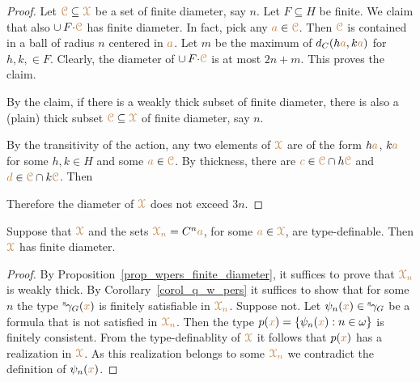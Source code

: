 \begin{proof}
  Let ${\color{brown}\EuScript C}\subseteq{\color{brown}\EuScript X}$ be a set of finite diameter, say $n$.
  Let $F\subseteq H$ be finite.
  We claim that also $\cup\,F{\cdot}{\color{brown}\EuScript C}$ has finite diameter.
  In fact, pick any ${\color{brown} a}\in{\color{brown}\EuScript C}$.
  Then ${\color{brown}\EuScript C}$ is contained in a ball of radius $n$ centered in ${\color{brown} a}$. Let $m$ be the maximum of $d_C(h{\color{brown} a}, k{\color{brown} a})$ for $h,k,\in F$.
  Clearly, the diameter of $\cup\,F{\cdot}{\color{brown}\EuScript C}$ is at most $2n+m$.
  This proves the claim.

  By the claim, if there is a weakly thick subset of finite diameter, there is also a (plain) thick subset ${\color{brown}\EuScript C}\subseteq{\color{brown}\EuScript X}$ of finite diameter, say $n$.
  
  By the transitivity of the action, any two elements of ${\color{brown}\EuScript X}$ are of the form $h{\color{brown} a}$, $k{\color{brown} a}$ for some $h,k\in H$ and some ${\color{brown} a}\in{\color{brown}\EuScript C}$.
  By thickness, there are ${\color{brown} c}\in{\color{brown}\EuScript C}\cap h{\color{brown}\EuScript C}$ and ${\color{brown} d}\in{\color{brown}\EuScript C}\cap k{\color{brown}\EuScript C}$.
  Then 



  Therefore the diameter of ${\color{brown}\EuScript X}$ does not exceed $3n$.
\end{proof}

\begin{theorem}\label{thm_newelski}
  Suppose that ${\color{brown}\EuScript X}$ and the sets ${\color{brown}\EuScript X_n}=C^n{\color{brown} a}$, for some ${\color{brown} a}\in{\color{brown}\EuScript X}$, are type-definable.
  Then ${\color{brown}\EuScript X}$ has finite diameter.
\end{theorem}

\begin{proof}
  By Proposition~\ref{prop_wpers_finite_diameter}, it suffices to prove that ${\color{brown}\EuScript X_n}$ is weakly thick.
  By Corollary~\ref{corol_q_w_pers} it suffices to show that for some $n$ the type ${}^{\rm s}\kern-.2ex\gamma_G({\color{brown} x})$ is finitely satisfiable in ${\color{brown}\EuScript X_n}$.
  Suppose not.
  Let $\psi_n({\color{brown} x})\in{}^{\rm s}\kern-.2ex\gamma_G$ be a formula that is not satisfied in $\color{brown}\EuScript X_n$.
  Then the type $p({\color{brown} x})=\{\psi_n({\color{brown} x}):n\in\omega\}$ is finitely consistent.
  From the type-definablity of ${\color{brown}\EuScript X}$ it follows that $p({\color{brown} x})$ has a realization in ${\color{brown}\EuScript X}$.
  As this realization belongs to some ${\color{brown}\EuScript X_n}$ we contradict the definition of $\psi_n({\color{brown} x})$.
\end{proof}


